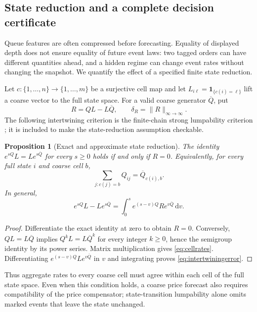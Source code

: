 \documentclass[11pt]{article}
\theoremstyle{plain}
\newtheorem{proposition}[theorem]{Proposition}
\theoremstyle{definition}
\theoremstyle{remark}
\newcommand{\dd}{\,\mathrm d}
\newcommand{\norm}[1]{\lVert#1\rVert}
\begin{document}
\subsection{State reduction and a complete decision certificate}

Queue features are often compressed before forecasting. Equality of
displayed depth does not ensure equality of future event laws: two
tagged orders can have different quantities ahead, and a hidden regime
can change event rates without changing the snapshot. We quantify
the effect of a specified finite state reduction.

Let \(c:\{1,\ldots,n\}\to\{1,\ldots,m\}\) be a surjective cell map
and let \(L_{i\ell}=\mathbf1_{\{c(i)=\ell\}}\) lift a coarse vector
to the full state space. 
For a valid coarse generator \(\overline Q\), put
\begin{equation}\label{eq:lumpresidual}
 R=QL-L\overline Q,\qquad
 \delta_R=\norm{R}_{\infty\to\infty}.
\end{equation}
The following intertwining criterion is the finite-chain strong
lumpability criterion \citep{Buchholz1994}; it is included to make
the state-reduction assumption checkable.

\begin{proposition}[Exact and approximate state reduction]
\label{prop:aggregation}
The identity \(e^{sQ}L=Le^{s\overline Q}\) for every \(s\ge0\)
holds if and only if \(R=0\). Equivalently, for every full state
\(i\) and coarse cell \(b\),
\begin{equation}\label{eq:cellrates}
 \sum_{j:c(j)=b}Q_{ij}=\overline Q_{c(i),b}.
\end{equation}
In general,
\begin{equation}\label{eq:intertwiningerror}
 e^{sQ}L-Le^{s\overline Q}
 =\int_0^s e^{(s-v)Q}R e^{v\overline Q}\dd v.
\end{equation}
\end{proposition}
\begin{proof}
Differentiate the exact identity at zero to obtain \(R=0\).
Conversely, \(QL=L\overline Q\) implies
\(Q^kL=L\overline Q^k\) for every integer \(k\ge0\), hence the
semigroup identity by its power series. Matrix multiplication gives
\eqref{eq:cellrates}. Differentiating
\(e^{(s-v)Q}Le^{v\overline Q}\) in \(v\) and integrating proves
\eqref{eq:intertwiningerror}.
\end{proof}

Thus aggregate rates to every coarse cell must agree within each
cell of the full state space. Even when this condition holds, a
coarse price forecast also requires compatibility of the price
compensator; state-transition lumpability alone omits marked events
that leave the state unchanged.
\end{document}
